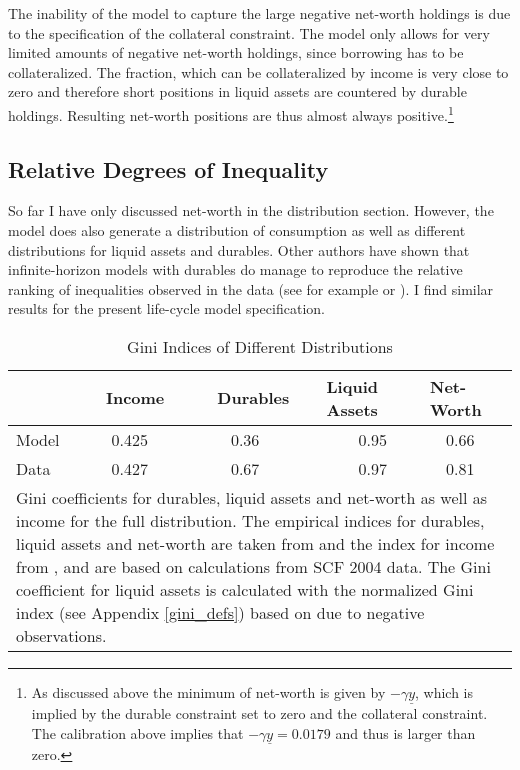 \documentclass[a4paper,12pt,legno]{article}
\begin{document}
The inability of the model to capture the large negative net-worth holdings is due to the specification of the collateral constraint. The model only allows for very limited amounts of negative net-worth holdings, since borrowing has to be collateralized. The fraction, which can be collateralized by income is very close to zero and therefore short positions in liquid assets are countered by durable holdings. Resulting net-worth positions are thus almost always positive.\footnote{As discussed above the minimum of net-worth is given by $-\gamma\underline{y}$, which is implied by the durable constraint set to zero and the collateral constraint. The calibration above implies that $-\gamma\underline{y} = 0.0179$ and thus is larger than zero.} 

\subsection{Relative Degrees of Inequality}
So far I have only discussed net-worth in the distribution section. However, the model does also generate a distribution of consumption as well as different distributions for liquid assets and durables. Other authors have shown that infinite-horizon models with durables do manage to reproduce the relative ranking of inequalities observed in the data (see for example \cite{hintermaier2010} or \cite{diaz2010}). I find similar results for the present life-cycle model specification.


\begin{table}[!htbp]
\centering
\caption{Gini Indices of Different Distributions}
\label{Gini_Ranking}
\begin{tabular}{@{}lllll@{}}
\toprule
       & \ \ Income & \ \ Durables & Liquid Assets & Net-Worth \\ \midrule
Model      &  \ \ \ 0.425 & \ \ \ \ 0.36   & \ \ \ \ 0.95        & \ \ 0.66    \\ \midrule
Data        & \ \ \ 0.427  & \ \ \ \ 0.67     & \ \ \ \ 0.97          & \ \ 0.81      \\ \bottomrule
\multicolumn{5}{l}{%
  \begin{minipage}{10.5cm}%
    \small Gini coefficients for durables, liquid assets and net-worth as well as income for the full distribution. The empirical indices for durables, liquid assets and net-worth are taken from \cite{hintermaier2010} and the index for income from \cite{hintermaier2011}, and are based on calculations from SCF 2004 data. The Gini coefficient for liquid assets is calculated with the normalized Gini index (see Appendix \ref{gini_defs}) based on \cite{chen1982} due to negative observations. 
  \end{minipage}%
}\\
\end{tabular}
\end{table}
\end{document}
